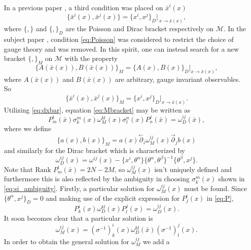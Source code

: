 \documentclass[a4paper,12pt]{article}
\theoremstyle{definition}
\theoremstyle{remark}
\numberwithin{equation}{section}
\newcommand{\al}{\alpha}
\newcommand{\be}{\beta}
\newcommand{\om}{\omega}
\newcommand{\si}{\sigma}
\newcommand{\ra}{\rightarrow}
\newcommand{\M}{\mathcal{M}}
\newcommand{\bx}{\bar{x}}
\newcommand{\pl}{\overset{\leftarrow}{\partial}}
\newcommand{\pr}{\overset{\rightarrow}{\partial}}
\begin{document}
In a previous paper \cite{Lyakhovich:2001cm}, a third condition was
placed on $\bx^i(x)$
\begin{equation}\label{eq:Poisson}
{\{\bx^i(x), \bx^j(x)\}}={\{x^i,x^j\}}_D|_{\:x \ra \bx(x)},
\end{equation}
where $\{,\}$ and $\{,\}_D$ are the Poisson and Dirac bracket
respectively on $\M$. In the subject paper \cite{Batalin:2001hs},
condition \eqref{eq:Poisson} was considered to restrict the choice
of gauge theory and was removed. In this spirit, one can instead
search for a new bracket $\{,\}_M$ on $\M$ with the property
\begin{equation}\label{eq:mybracket}
\{A(\bx(x)),B(\bx(x))\}_M=\{A(x),B(x)\}_D|_{x \ra \bx(x)},
\end{equation}
where $A(\bx(x))$ and $B(\bx(x))$ are arbitrary, gauge invariant
observables. So
\begin{equation} \label{eq:Mbracket}
\{\bx^i(x),\bx^j(x)\}_M=\{x^i,x^j\}_D|_{x \ra \bx(x)}.
\end{equation}
Utilizing \eqref{eq:dxbar}, equation \eqref{eq:Mbracket} may be
written as
\begin{equation}
P^i_m(\bx)\si^m_k(x)\om^{kl}_M(x)\si_l^n(x)P_n^j(\bx)=\om^{ij}_D(\bx),
\end{equation}
where we define
\begin{equation}
\{a(x),b(x)\}_M=a(x)\pl_i\om^{ij}_M(x)\pr_j b(x)
\end{equation}
and similarly for the Dirac bracket which is characterized by
\begin{equation}
\om_D^{ij}(x)=\om^{ij}(x) - \{x^i,\theta^\al\}
\{\theta^\al,\theta^\be\}^{-1} \{\theta^\be ,x^j\}.
\end{equation}
Note that $\text{Rank }P^i_m(\bx)=2N-2M$, so $\om_M^{ij}(x)$ isn't
uniquely defined and furthermore this is also reflected by the
ambiguity in choosing $\si^m_k(x)$ shown in
\eqref{eq:si_ambiguity}. Firstly, a particular solution for
$\om^{ij}_M(x)$ must be found. Since $\{\theta^\al,x^j\}_D=0$ and
making use of the explicit expression for $P^i_j(x)$ in
\eqref{eq:P}, \begin{equation}\label{eq:PomP}
P^i_k(x)\om^{kl}_D(x)P_l^j(x)=\om^{ij}_D(x).
\end{equation}
It soon becomes clear that a particular solution is
\begin{equation}\label{eq:omM}
\om^{ij}_M(x)=(\si^{-1})^i_k(x)\om^{kl}_D(\bx)(\si^{-1})_l^j(x).
\end{equation}
In order to obtain the general solution for $\om^{ij}_M$ we add a
\end{document}

